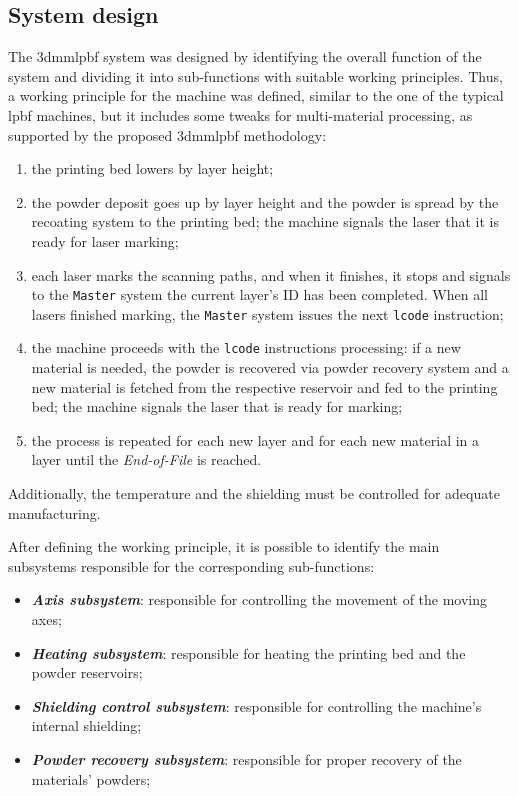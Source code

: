 \subsection{System design}
The \gls{3dmmlpbf} system was designed by identifying the overall
function of the system and dividing it into sub-functions with suitable working
principles. Thus, a working principle for the machine was defined, similar to the
one of the typical \gls{lpbf} machines, but it includes some tweaks for
multi-material processing, as supported by the proposed \gls{3dmmlpbf} methodology:
\begin{enumerate}
\item the printing bed lowers by layer height;
\item the powder deposit goes up by layer height and the powder is spread by
  the recoating system to the printing bed; the machine signals the laser that
  it is ready for laser marking;
\item each laser marks the scanning paths, and when it finishes, it stops and
  signals to the \texttt{Master} system the current layer's ID has been
  completed. When all lasers finished marking, the \texttt{Master} system
  issues the next \texttt{lcode} instruction;
\item the machine proceeds with the \texttt{lcode} instructions processing: if a
  new material is needed, the powder is recovered via powder recovery system
  and a new material is fetched from the respective reservoir and fed to the
  printing bed; the machine signals the laser that is ready for marking;
\item the process is repeated for each new layer and for each new material
  in a layer until the \emph{End-of-File} is reached.
\end{enumerate}
Additionally, the temperature and the shielding must be controlled for adequate manufacturing.

After defining the working principle, it is possible to identify the main
subsystems responsible for the corresponding sub-functions:
\begin{itemize}
\item \textbf{\emph{Axis subsystem}}: responsible for controlling the
  movement of the moving axes;
\item \textbf{\emph{Heating subsystem}}: responsible for heating the
  printing bed and the powder reservoirs;
\item \textbf{\emph{Shielding control subsystem}}: responsible for
  controlling the machine's internal shielding;
\item \textbf{\emph{Powder recovery subsystem}}: responsible for proper
  recovery of the materials' powders;
\end{itemize}

